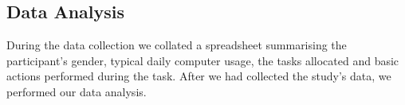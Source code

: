 \documentclass{sigchi}
\begin{document}



\subsection{Data Analysis}

During the data collection we collated a spreadsheet summarising the participant's gender, typical daily computer usage, the tasks allocated and basic actions performed during the task.  After we had collected the study's data, we performed our data analysis. 
\end{document}
